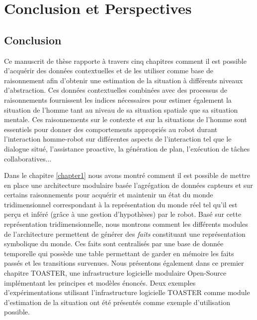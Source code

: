 \documentclass[a4paper,11pt,twoside]{StyleThese}
\begin{document}
\fi


\chapter*{Conclusion et Perspectives}

\section{Conclusion}
Ce manuscrit de thèse rapporte à travers cinq chapitres comment il est possible d'acquérir des données contextuelles et de les utiliser comme base de raisonnement afin d'obtenir une estimation de la situation à différents niveaux d'abstraction. Ces données contextuelles combinées avec des processus de raisonnements fournissent les indices nécessaires pour estimer également la situation de l'homme tant au niveau de sa situation spatiale que sa situation mentale. Ces raisonnements sur le contexte et sur la situations de l'homme sont essentiels pour donner des comportements appropriés au robot durant l'interaction homme-robot sur différentes aspects de l'interaction tel que le dialogue situé, l'assistance proactive, la génération de plan, l'exécution de tâches collaboratives...

Dans le chapitre \ref{chapter1} nous avons montré comment il est possible de mettre en place une architecture modulaire basée l'agrégation de données capteurs et sur certains raisonnements pour acquérir et maintenir un état du monde tridimensionnel correspondant à la représentation du monde réel tel qu'il est perçu et inféré (grâce à une gestion d'hypothèses) par le robot. Basé sur cette représentation tridimensionnelle, nous montrons comment les différents modules de l'architecture permettent de générer des \textit{faits} constituant une représentation symbolique du monde. Ces faits sont centralisés par une base de donnée temporelle qui possède une table permettant de garder en mémoire les faits passés et les transitions survenues. Nous présentons également dans ce premier chapitre TOASTER, une infrastructure logicielle modulaire Open-Source implémentant les principes et modèles énoncés.
Deux exemples d'expérimentations utilisant l'infrastructure logicielle TOASTER comme module d'estimation de la situation ont été présentés comme exemple d'utilisation possible.
\end{document}
